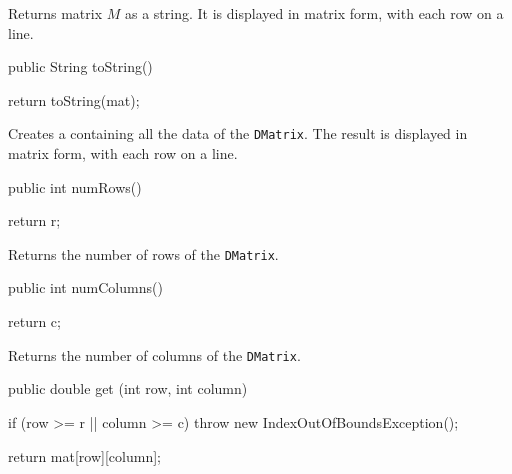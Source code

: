 \begin{tabb} Returns matrix $M$ as a string.
It is displayed in matrix form, with each row on a line.
\end{tabb}
\begin{htmlonly}
\end{htmlonly}
\begin{code}

   public String toString() \begin{hide} {
      return toString(mat);
   } \end{hide}
\end{code}
\begin{tabb} Creates a  containing all the data of
  the \texttt{DMatrix}. The result is displayed in matrix form, with
  each row on a line.
\end{tabb}
\begin{htmlonly}
\end{htmlonly}
\begin{code}

   public int numRows() \begin{hide} {
      return r;
   } \end{hide}
\end{code}
\begin{tabb} Returns the number of rows of the \texttt{DMatrix}.
\end{tabb}
\begin{htmlonly}
\end{htmlonly}
\begin{code}

   public int numColumns() \begin{hide} {
      return c;
   } \end{hide}
\end{code}
\begin{tabb} Returns the number of columns of the \texttt{DMatrix}.
\end{tabb}
\begin{htmlonly}
\end{htmlonly}
\begin{code}

   public double get (int row, int column) \begin{hide} {
      if (row >= r || column >= c)
         throw new IndexOutOfBoundsException();

      return mat[row][column];
   } \end{hide}
\end{code}
